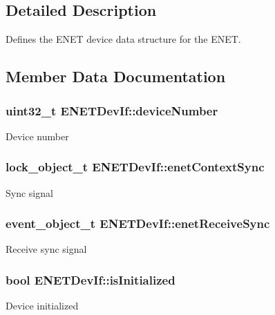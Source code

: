\subsection{Detailed Description}
Defines the E\+N\+ET device data structure for the E\+N\+ET. 

\subsection{Member Data Documentation}
\subsubsection[{\texorpdfstring{device\+Number}{deviceNumber}}]{\setlength{\rightskip}{0pt plus 5cm}uint32\+\_\+t E\+N\+E\+T\+Dev\+If\+::device\+Number}\hypertarget{structENETDevIf_ad777399a38100a380730be25f370ed18}{}\label{structENETDevIf_ad777399a38100a380730be25f370ed18}
Device number 
\subsubsection[{\texorpdfstring{enet\+Context\+Sync}{enetContextSync}}]{\setlength{\rightskip}{0pt plus 5cm}lock\+\_\+object\+\_\+t E\+N\+E\+T\+Dev\+If\+::enet\+Context\+Sync}\hypertarget{structENETDevIf_accfc394f01c58f55defec44c80dd0d3e}{}\label{structENETDevIf_accfc394f01c58f55defec44c80dd0d3e}
Sync signal 
\subsubsection[{\texorpdfstring{enet\+Receive\+Sync}{enetReceiveSync}}]{\setlength{\rightskip}{0pt plus 5cm}event\+\_\+object\+\_\+t E\+N\+E\+T\+Dev\+If\+::enet\+Receive\+Sync}\hypertarget{structENETDevIf_a28d5d955e82f341500ba1bf8ed6649b0}{}\label{structENETDevIf_a28d5d955e82f341500ba1bf8ed6649b0}
Receive sync signal 
\subsubsection[{\texorpdfstring{is\+Initialized}{isInitialized}}]{\setlength{\rightskip}{0pt plus 5cm}bool E\+N\+E\+T\+Dev\+If\+::is\+Initialized}\hypertarget{structENETDevIf_adf1b2b7608495df389cb3a04d5481a96}{}\label{structENETDevIf_adf1b2b7608495df389cb3a04d5481a96}
Device initialized 
